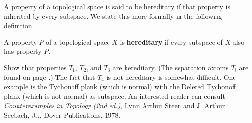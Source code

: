 \item A property of a topological space is said to be hereditary if that property is inherited by every subspace. We state this more  formally in the following definition.

\begin{definition} A property $P$ of a topological space $X$ is \textbf{hereditary} if every subspace of $X$ also has property $P$.
\end{definition}

Show that properties $T_1$, $T_2$, and $T_3$ are hereditary. (The separation axioms $T_i$ are found on page \pageref{sec:Closed_sets_topology}.) The fact that $T_4$ is not hereditary is somewhat difficult. One example is the Tychonoff plank (which is normal) with the Deleted Tychonoff plank (which is not normal) as subspace. An interested reader can consult \emph{Counterexamples in Topology (2nd ed.)}, Lynn Arthur Steen and J. Arthur Seebach, Jr., Dover Publications, 1978.

\begin{comment}

\ExerciseSolution \item Let $X$ be a topological space and $Y$ a subspace of $X$. We consider each property in turn.

	\begin{itemize}
	
	\item Suppose that $X$ is $T_1$. To show that $Y$ is $T_1$, let $y_1$ and $y_2$ be distinct points in $Y$. Then $y_1$ and $y_2$ are distinct points in $X$. The fact that $X$ is $T_1$ implies that there is an open set $O$ in $X$ that contains $y_2$ but not $y_1$. The set $U = O \cap Y$ is open in $Y$ and $y_2 \in U$ but $y_1 \notin U$. We conclude that $Y$ is also $T_1$.
	
	\item This is done in Exercise \ref{ex:Closed_sets:Hausdorff_subspace} on page \pageref{ex:Closed_sets:Hausdorff_subspace}.
	
	\item Suppose that $X$ is $T_3$. Then $X$ is $T_1$ and part (a) shows that $Y$ is $T_1$. So we need to show that $Y$ is regular (this argument also shows that being regular is hereditary). Let $C$ be a closed subset of $Y$ and let $y \in Y \setminus C$. There is a closed subset $D$ of $X$ such that $C = D \cap Y$. Since $y \notin C$ and $y \in Y$, it follows that $y \notin D$. So there exists an open set $O$ in $X$ such that $D \subseteq O$ and $y \notin O$. Let $U = O \cap Y$. Then $U$ is open in $Y$ and 
	\[C = D \cap Y \subseteq O \cap Y = U.\]
Finally, $y \notin O$ so $y \notin U$. We conclude that $Y$ is $T_3$.  
	
	
	\end{itemize}

\end{comment}

